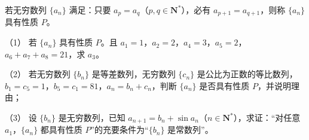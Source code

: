 \begin{question}
若无穷数列 \(\{a_n\}\) 满足：只要 \(a_p=a_q\)（\(p,q\in\mathbf{N}^*\)），必有 \(a_{p+1}=a_{q+1}\)，则称 \(\{a_n\}\) 具有性质 \(P\)。

（1） 若 \(\{a_n\}\) 具有性质 \(P\)。且 \(a_1=1\)，\(a_2=2\)，\(a_4=3\)，\(a_5=2\)，\(a_6+a_7+a_8=21\)，求 \(a_3\)。

（2） 若无穷数列 \(\{b_n\}\) 是等差数列，无穷数列 \(\{c_n\}\) 是公比为正数的等比数列，\(b_1=c_5=1\)，\(b_5=c_1=81\)，\(a_n=b_n+c_n\)，判断 \(\{a_n\}\) 是否具有性质 \(P\)，并说明理由；

（3） 设 \(\{b_n\}\) 是无穷数列，已知 \(a_{n+1}=b_n+\sin a_n\)（\(n\in\mathbf{N}^*\)），求证：“对任意 \(a_1\)，\(\{a_n\}\) 都具有性质 \(P\)”的充要条件为“\(\{b_n\}\) 是常数列”。

\end{question}